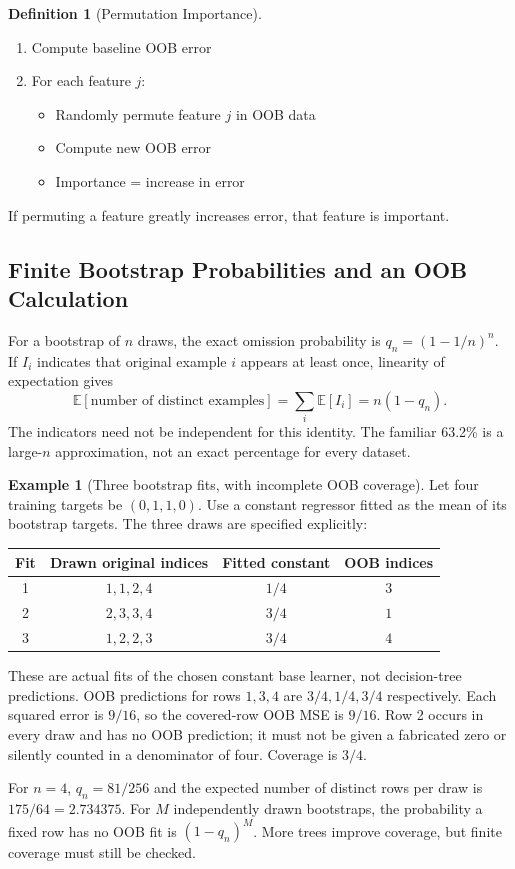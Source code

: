 \documentclass[11pt,twoside]{article}
\numberwithin{equation}{section}
\newcommand{\E}{\mathbb{E}}
\theoremstyle{plain}
\theoremstyle{definition}
\newtheorem{definition}[theorem]{Definition}
\newtheorem{example}[theorem]{Example}
\theoremstyle{remark}
\begin{document}
\begin{definition}[Permutation Importance]
\begin{enumerate}
\item Compute baseline OOB error
\item For each feature $j$:
\begin{itemize}
\item Randomly permute feature $j$ in OOB data
\item Compute new OOB error
\item Importance = increase in error
\end{itemize}
\end{enumerate}

If permuting a feature greatly increases error, that feature is important.
\end{definition}

\subsection{Finite Bootstrap Probabilities and an OOB Calculation}
For a bootstrap of $n$ draws, the exact omission probability is $q_n=(1-1/n)^n$. If $I_i$ indicates that original example $i$ appears at least once, linearity of expectation gives
\[
\E[\text{number of distinct examples}]=\sum_i\E[I_i]
=n(1-q_n).
\]
The indicators need not be independent for this identity. The familiar 63.2\% is a large-$n$ approximation, not an exact percentage for every dataset.

\begin{example}[Three bootstrap fits, with incomplete OOB coverage]
Let four training targets be $(0,1,1,0)$. Use a constant regressor fitted as the mean of its bootstrap targets. The three draws are specified explicitly:
\begin{center}
\begin{tabular}{c|c|c|c}
Fit & Drawn original indices & Fitted constant & OOB indices\\\hline
1 & $1,1,2,4$ & $1/4$ & $3$\\
2 & $2,3,3,4$ & $3/4$ & $1$\\
3 & $1,2,2,3$ & $3/4$ & $4$
\end{tabular}
\end{center}
These are actual fits of the chosen constant base learner, not decision-tree predictions. OOB predictions for rows $1,3,4$ are $3/4,1/4,3/4$ respectively. Each squared error is $9/16$, so the covered-row OOB MSE is $9/16$. Row 2 occurs in every draw and has no OOB prediction; it must not be given a fabricated zero or silently counted in a denominator of four. Coverage is $3/4$.

For $n=4$, $q_n=81/256$ and the expected number of distinct rows per draw is $175/64=2.734375$. For $M$ independently drawn bootstraps, the probability a fixed row has no OOB fit is $(1-q_n)^M$. More trees improve coverage, but finite coverage must still be checked.
\end{example}
\end{document}
